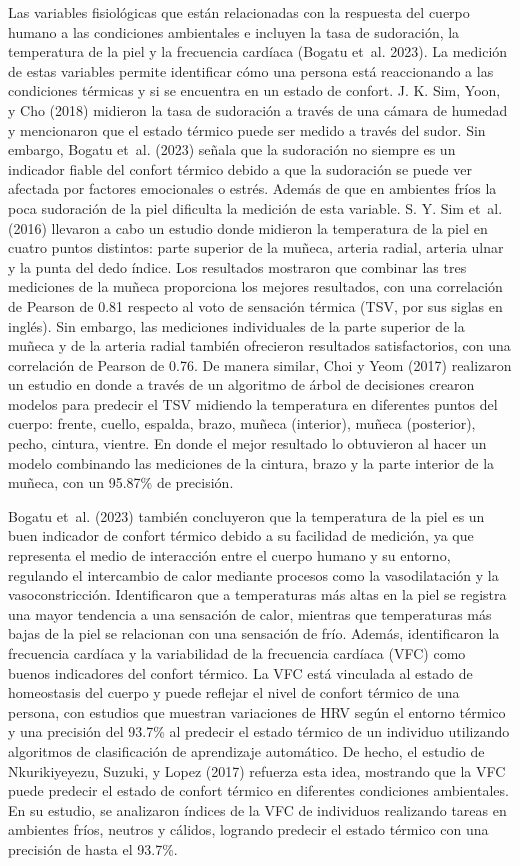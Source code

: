 \documentclass[
  12pt,
  letterpaper,
  DIV=11,
  numbers=noendperiod]{scrreport}
\begin{document}
Las variables fisiológicas que están relacionadas con la respuesta del
cuerpo humano a las condiciones ambientales e incluyen la tasa de
sudoración, la temperatura de la piel y la frecuencia cardíaca (Bogatu
et~al. 2023). La medición de estas variables permite identificar cómo
una persona está reaccionando a las condiciones térmicas y si se
encuentra en un estado de confort. J. K. Sim, Yoon, y Cho (2018)
midieron la tasa de sudoración a través de una cámara de humedad y
mencionaron que el estado térmico puede ser medido a través del sudor.
Sin embargo, Bogatu et~al. (2023) señala que la sudoración no siempre es
un indicador fiable del confort térmico debido a que la sudoración se
puede ver afectada por factores emocionales o estrés. Además de que en
ambientes fríos la poca sudoración de la piel dificulta la medición de
esta variable. S. Y. Sim et~al. (2016) llevaron a cabo un estudio donde
midieron la temperatura de la piel en cuatro puntos distintos: parte
superior de la muñeca, arteria radial, arteria ulnar y la punta del dedo
índice. Los resultados mostraron que combinar las tres mediciones de la
muñeca proporciona los mejores resultados, con una correlación de
Pearson de 0.81 respecto al voto de sensación térmica (TSV, por sus
siglas en inglés). Sin embargo, las mediciones individuales de la parte
superior de la muñeca y de la arteria radial también ofrecieron
resultados satisfactorios, con una correlación de Pearson de 0.76. De
manera similar, Choi y Yeom (2017) realizaron un estudio en donde a
través de un algoritmo de árbol de decisiones crearon modelos para
predecir el TSV midiendo la temperatura en diferentes puntos del cuerpo:
frente, cuello, espalda, brazo, muñeca (interior), muñeca (posterior),
pecho, cintura, vientre. En donde el mejor resultado lo obtuvieron al
hacer un modelo combinando las mediciones de la cintura, brazo y la
parte interior de la muñeca, con un 95.87\% de precisión.

Bogatu et~al. (2023) también concluyeron que la temperatura de la piel
es un buen indicador de confort térmico debido a su facilidad de
medición, ya que representa el medio de interacción entre el cuerpo
humano y su entorno, regulando el intercambio de calor mediante procesos
como la vasodilatación y la vasoconstricción. Identificaron que a
temperaturas más altas en la piel se registra una mayor tendencia a una
sensación de calor, mientras que temperaturas más bajas de la piel se
relacionan con una sensación de frío. Además, identificaron la
frecuencia cardíaca y la variabilidad de la frecuencia cardíaca (VFC)
como buenos indicadores del confort térmico. La VFC está vinculada al
estado de homeostasis del cuerpo y puede reflejar el nivel de confort
térmico de una persona, con estudios que muestran variaciones de HRV
según el entorno térmico y una precisión del 93.7\% al predecir el
estado térmico de un individuo utilizando algoritmos de clasificación de
aprendizaje automático. De hecho, el estudio de Nkurikiyeyezu, Suzuki, y
Lopez (2017) refuerza esta idea, mostrando que la VFC puede predecir el
estado de confort térmico en diferentes condiciones ambientales. En su
estudio, se analizaron índices de la VFC de individuos realizando tareas
en ambientes fríos, neutros y cálidos, logrando predecir el estado
térmico con una precisión de hasta el 93.7\%.
\end{document}
